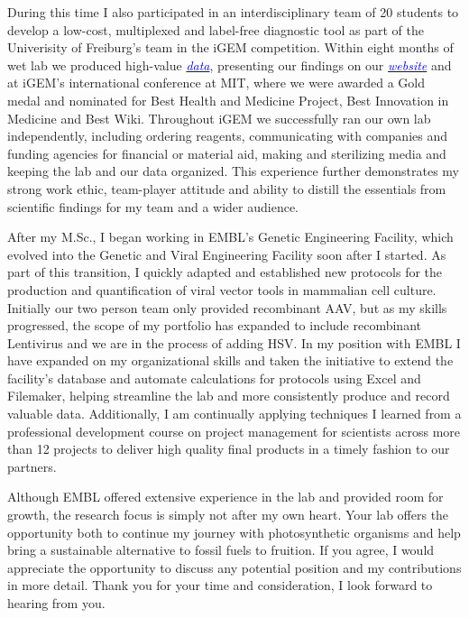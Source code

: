 \documentclass[11pt,a4paper,sans]{moderncv}
\begin{document}
\begin{spacing}{1.2}
During this time I also participated in an interdisciplinary team of 20 students to develop a low-cost, multiplexed and label-free diagnostic tool as part of the Univerisity of Freiburg's team in the iGEM competition.
Within eight months of wet lab we produced high-value {\href{https://www.ncbi.nlm.nih.gov/pubmed/29803867}{\textcolor{blue}{\textit{data}}}}, presenting our findings on our {\href{http://2015.igem.org/Team:Freiburg/Home_Intro}{\textcolor{blue}{\textit{website}}}} and at iGEM's international conference at MIT, where we were awarded a Gold medal and nominated for Best Health and Medicine Project, Best Innovation in Medicine and Best Wiki.
Throughout iGEM we successfully ran our own lab independently, including ordering reagents, communicating with companies and funding agencies for financial or material aid, making and sterilizing media and keeping the lab and our data organized. 
This experience further demonstrates my strong work ethic, team-player attitude and ability to distill the essentials from scientific findings for my team and a wider audience.\par\vspace*{3mm}
		
After my M.Sc., I began working in EMBL's Genetic Engineering Facility, which evolved into the Genetic and Viral Engineering Facility soon after I started. 
As part of this transition, I quickly adapted and established new protocols for the production and quantification of viral vector tools in mammalian cell culture. 			
Initially our two person team only provided recombinant AAV, but as my skills progressed, the scope of my portfolio has expanded to include recombinant Lentivirus and we are in the process of adding HSV.
In my position with EMBL I have expanded on my organizational skills and taken the initiative to extend the facility's database and automate calculations for protocols using Excel and Filemaker, helping streamline the lab and more consistently produce and record valuable data.
Additionally, I am continually applying techniques I learned from a professional development course on project management for scientists across more than 12 projects to deliver high quality final products in a timely fashion to our partners.\par\vspace*{3mm}

Although EMBL offered extensive experience in the lab and provided room for growth, the research focus is simply not after my own heart.
Your lab offers the opportunity both to continue my journey with photosynthetic organisms and help bring a sustainable alternative to fossil fuels to fruition. 
If you agree, I would appreciate the opportunity to discuss any potential position and my contributions in more detail. 
Thank you for your time and consideration, I look forward to hearing from you.
 
\vspace{5mm}
\end{spacing}
\makeletterclosing
\end{document}
